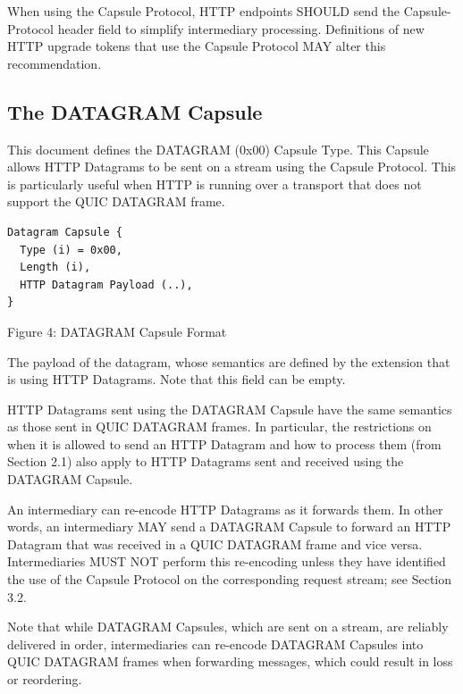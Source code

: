 \documentclass{article}
\begin{document}
When using the Capsule Protocol, HTTP endpoints SHOULD send the
Capsule-Protocol header field to simplify intermediary processing.
Definitions of new HTTP upgrade tokens that use the Capsule Protocol
MAY alter this recommendation.

\subsection{The DATAGRAM Capsule}

This document defines the DATAGRAM (0x00) Capsule Type.  This Capsule
allows HTTP Datagrams to be sent on a stream using the Capsule
Protocol.  This is particularly useful when HTTP is running over a
transport that does not support the QUIC DATAGRAM frame.

\begin{verbatim}
Datagram Capsule {
  Type (i) = 0x00,
  Length (i),
  HTTP Datagram Payload (..),
}
\end{verbatim}

\begin{center}
Figure 4: DATAGRAM Capsule Format
\end{center}

\begin{description}[style=unboxed, leftmargin=0.5cm]
\item[HTTP Datagram Payload:]  The payload of the datagram, whose semantics
   are defined by the extension that is using HTTP Datagrams.  Note
   that this field can be empty.
\end{description}

HTTP Datagrams sent using the DATAGRAM Capsule have the same
semantics as those sent in QUIC DATAGRAM frames.  In particular, the
restrictions on when it is allowed to send an HTTP Datagram and how
to process them (from Section 2.1) also apply to HTTP Datagrams sent
and received using the DATAGRAM Capsule.

An intermediary can re-encode HTTP Datagrams as it forwards them.  In
other words, an intermediary MAY send a DATAGRAM Capsule to forward
an HTTP Datagram that was received in a QUIC DATAGRAM frame and vice
versa.  Intermediaries MUST NOT perform this re-encoding unless they
have identified the use of the Capsule Protocol on the corresponding
request stream; see Section 3.2.

Note that while DATAGRAM Capsules, which are sent on a stream, are
reliably delivered in order, intermediaries can re-encode DATAGRAM
Capsules into QUIC DATAGRAM frames when forwarding messages, which
could result in loss or reordering.
\end{document}
